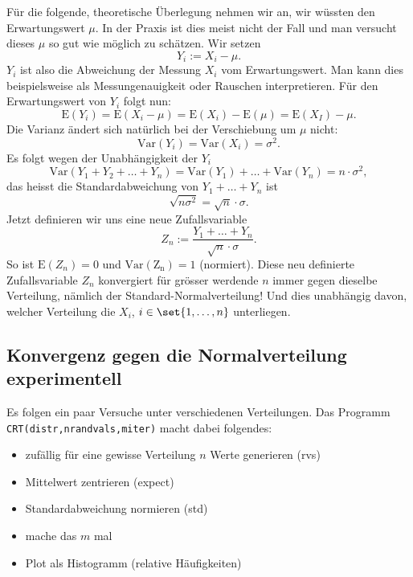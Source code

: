 \documentclass[%
11pt,%
twoside,%
titlepage,%
german,%
headsepline%
]{scrartcl}
\newcounter{theo}[section]\setcounter{theo}{0}
\begin{document}
Für die folgende, theoretische Überlegung nehmen wir an, wir wüssten den Erwartungswert $\mu$. In der Praxis ist dies meist nicht der Fall und man versucht dieses $\mu$ so gut wie möglich zu schätzen. Wir setzen
$$Y_i:=X_i-\mu.$$
$Y_i$ ist also die Abweichung der Messung $X_i$ vom Erwartungswert. Man kann dies beispielsweise als Messungenauigkeit oder Rauschen interpretieren. Für den Erwartungswert von $Y_i$ folgt nun:
$$\mathrm{E}(Y_i)=\mathrm{E}(X_i-\mu)=\mathrm{E}(X_i)-\mathrm{E}(\mu)=\mathrm{E}(X_I)-\mu.$$
Die Varianz ändert sich natürlich bei der Verschiebung um $\mu$ nicht:
$$\mathrm{Var}(Y_i)=\mathrm{Var}(X_i)=\sigma^2.$$
Es folgt wegen der Unabhängigkeit der $Y_i$
$$\mathrm{Var}(Y_1+Y_2+\dots+Y_n)=\mathrm{Var}(Y_1)+\dots+\mathrm{Var}(Y_n)=n\cdot\sigma^2,$$
das heisst die Standardabweichung von $Y_1+\dots+Y_n$ ist
$$\sqrt{n\sigma^2}=\sqrt{n}\cdot\sigma.$$
Jetzt definieren wir uns eine neue Zufallsvariable
$$Z_n:=\frac{Y_1+\dots+Y_n}{\sqrt{n}\cdot\sigma}.$$
So ist $\mathrm{E}(Z_n)=0$ und $\mathrm{Var(Z_n)}=1$ (normiert). Diese neu definierte Zufallsvariable $Z_n$ konvergiert für grösser werdende $n$ immer gegen dieselbe Verteilung, nämlich der Standard-Normalverteilung! Und dies unabhängig davon, welcher Verteilung die $X_i$, $i\in\set{1,\dots,n}$ unterliegen.

\subsection{Konvergenz gegen die Normalverteilung experimentell}

Es folgen ein paar Versuche unter verschiedenen Verteilungen. Das Programm \texttt{CRT(distr,nrandvals,miter)} macht dabei folgendes:
\begin{itemize}
    \item zufällig für eine gewisse Verteilung $n$ Werte generieren (rvs)
    \item Mittelwert zentrieren (expect)
    \item Standardabweichung normieren (std)
    \item mache das $m$ mal
    \item Plot als Histogramm (relative Häufigkeiten)
\end{itemize}

\clearpage



\end{document}
